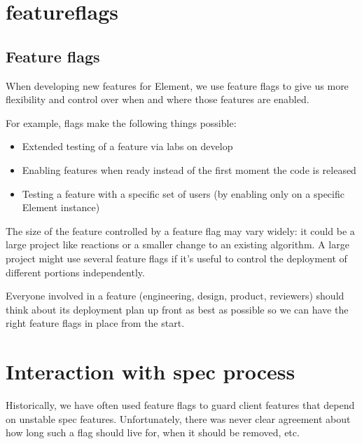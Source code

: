 \documentclass[letterpaper,10pt,openany,oneside,english]{sphinxmanual}
\begin{document}
\chapter{feature\sphinxhyphen{}flags}
\label{\detokenize{feature-flags:feature-flags}}\label{\detokenize{feature-flags::doc}}

\section{Feature flags}
\label{\detokenize{feature-flags:id1}}
\sphinxAtStartPar
When developing new features for Element, we use feature flags to give us more
flexibility and control over when and where those features are enabled.

\sphinxAtStartPar
For example, flags make the following things possible:
\begin{itemize}
\item {} 
\sphinxAtStartPar
Extended testing of a feature via labs on develop

\item {} 
\sphinxAtStartPar
Enabling features when ready instead of the first moment the code is released

\item {} 
\sphinxAtStartPar
Testing a feature with a specific set of users (by enabling only on a specific
Element instance)

\end{itemize}

\sphinxAtStartPar
The size of the feature controlled by a feature flag may vary widely: it could
be a large project like reactions or a smaller change to an existing algorithm.
A large project might use several feature flags if it’s useful to control the
deployment of different portions independently.

\sphinxAtStartPar
Everyone involved in a feature (engineering, design, product, reviewers) should
think about its deployment plan up front as best as possible so we can have the
right feature flags in place from the start.


\chapter{Interaction with spec process}
\label{\detokenize{feature-flags:interaction-with-spec-process}}
\sphinxAtStartPar
Historically, we have often used feature flags to guard client features that
depend on unstable spec features. Unfortunately, there was never clear agreement
about how long such a flag should live for, when it should be removed, etc.
\end{document}
